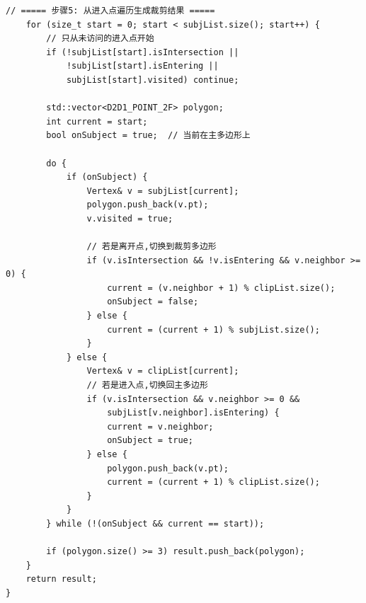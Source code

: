\documentclass[12pt,a4paper]{article}
\begin{document}
\begin{tcolorbox}
\begin{lstlisting}[caption={Weiler-Atherton多边形裁剪算法核心实现}]
    // ===== 步骤5: 从进入点遍历生成裁剪结果 =====
    for (size_t start = 0; start < subjList.size(); start++) {
        // 只从未访问的进入点开始
        if (!subjList[start].isIntersection || 
            !subjList[start].isEntering || 
            subjList[start].visited) continue;
        
        std::vector<D2D1_POINT_2F> polygon;
        int current = start;
        bool onSubject = true;  // 当前在主多边形上
        
        do {
            if (onSubject) {
                Vertex& v = subjList[current];
                polygon.push_back(v.pt);
                v.visited = true;
                
                // 若是离开点,切换到裁剪多边形
                if (v.isIntersection && !v.isEntering && v.neighbor >= 0) {
                    current = (v.neighbor + 1) % clipList.size();
                    onSubject = false;
                } else {
                    current = (current + 1) % subjList.size();
                }
            } else {
                Vertex& v = clipList[current];
                // 若是进入点,切换回主多边形
                if (v.isIntersection && v.neighbor >= 0 && 
                    subjList[v.neighbor].isEntering) {
                    current = v.neighbor;
                    onSubject = true;
                } else {
                    polygon.push_back(v.pt);
                    current = (current + 1) % clipList.size();
                }
            }
        } while (!(onSubject && current == start));
        
        if (polygon.size() >= 3) result.push_back(polygon);
    }
    return result;
}
\end{lstlisting}

\end{tcolorbox}

\clearpage
\end{document}
